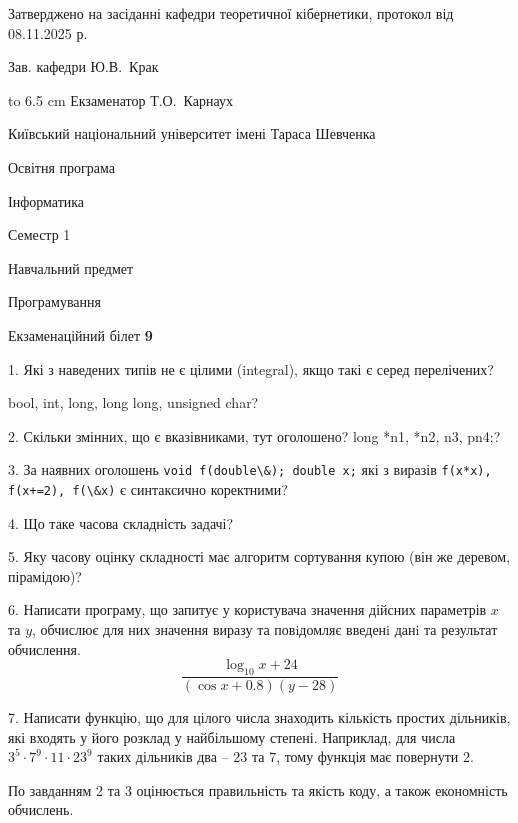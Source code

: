 \documentclass[12pt, ukrainian]{article}
\def\code#1{\Verb!#1!}
\begin{document}
{\smallskip\smallskip \begin {scriptsize} Затверджено на засіданні кафедри теоретичної кібернетики, протокол   від   08.11.2025 р.\par\smallskip\smallskip\smallskip\smallskip
{\parbox {6.5 cm} {Зав. кафедри \dotfill Ю.В.~Крак}}\hspace {0.7cm} {\hbox to 6.5 cm { Екзаменатор \dotfill Т.О.~Карнаух}} \end{scriptsize}}
\newpage
{{\begin {scriptsize}\par
{ \center  Київський національний університет імені Тараса Шевченка \par}
{\parbox {5 cm}{Освітня програма \hfill}{\parbox {7 cm}{Інформатика\hfill}}\parbox {6 cm}{\hfill Семестр 1}}\par
{\parbox {5 cm} {Навчальний предмет \hfill}\parbox {7 cm}{Програмування \hfill}\parbox {6cm}{\hfill}\par}\vspace{-15pt} \end{scriptsize}}{\center Екзаменаційний білет \No \textbf { 9 }\par}}
{%
1. Які з наведених типів не є цілими (integral), якщо такі є серед перелічених?

bool, int, long, long long, unsigned char?
\par
\vspace{2mm}
2. Скільки змінних, що є вказівниками, тут оголошено?
long *n1, *n2, n3, pn4;?
\par
\vspace{2mm}
3. За наявних оголошень \code{void f(double\&); double x;} які з виразів \code{f(x*x), f(x+=2), f(\&x)} є синтаксично коректними?
\par
\vspace{2mm}
4. Що таке часова складність задачі?
\par
\vspace{2mm}
5. Яку часову оцінку складності має алгоритм сортування купою (він же деревом, пірамідою)?
\par
\vspace{2mm}
6. Написати програму, що запитує у користувача значення дійсних параметрів $x$ та $y$, обчислює для них значення виразу та повiдомляє введенi данi та результат обчислення.
$$\frac{\log_{10} x + 24}{(\cos x + 0.8) (y - 28)}$$ 

\par
7. Написати функцію, що для цілого числа знаходить кількість простих дільників, які входять у його розклад у найбільшому степені. Наприклад, для числа $3^5{\cdot}7^9{\cdot}11{\cdot}23^{9}$ таких дільників два – $23$ та $7$, тому функція має повернути $2$.

По завданням 2 та 3 оцінюється правильність та якість коду, а також економність обчислень.

}
\end{document}
